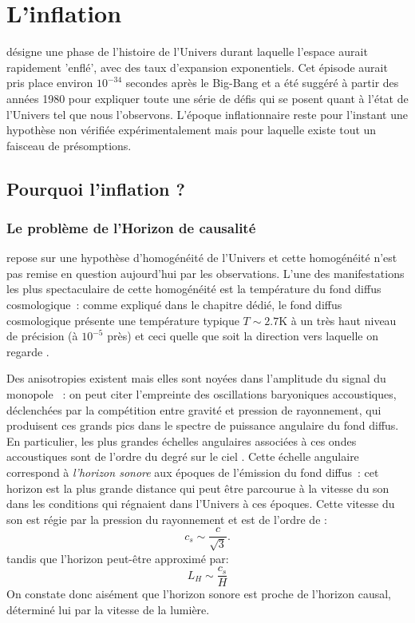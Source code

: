 \chapter{L'inflation}
 désigne une phase de l'histoire de l'Univers durant laquelle l'espace aurait rapidement 'enflé', avec des taux d'expansion exponentiels. Cet épisode aurait pris place environ $10^{-34}$ secondes après le Big-Bang et a été suggéré à partir des années 1980 pour expliquer toute une série de défis qui se posent quant à l'état de l'Univers tel que nous l'observons. L'époque inflationnaire reste pour l'instant une hypothèse non vérifiée expérimentalement mais pour laquelle existe tout un faisceau de présomptions.

\section{Pourquoi l'inflation ?}
\subsection{Le problème de l'Horizon de causalité}
 repose sur une hypothèse d'homogénéité de l'Univers et cette homogénéité n'est pas remise en question aujourd'hui par les observations. L'une des manifestations les plus spectaculaire de cette homogénéité est la température du fond diffus cosmologique~: comme expliqué dans le chapitre dédié, le fond diffus cosmologique présente une température typique $T\sim 2.7 $K à un très haut niveau de précision (à $10^{-5}$ près) et ceci quelle que soit la direction vers laquelle on regarde . 

Des anisotropies existent mais elles sont noyées dans l'amplitude du signal du monopole~ : on peut citer l'empreinte des oscillations baryoniques accoustiques, déclenchées par la compétition entre gravité et pression de rayonnement, qui produisent ces grands pics dans le spectre de puissance angulaire du fond diffus. En particulier, les plus grandes échelles angulaires associées à ces ondes accoustiques sont de l'ordre du degré sur le ciel . Cette échelle angulaire correspond à \textit{l'horizon sonore} aux époques de l'émission du fond diffus~: cet horizon est la plus grande distance qui peut être parcourue à la vitesse du son dans les conditions qui régnaient dans l'Univers à ces époques. Cette vitesse du son est régie par la pression du rayonnement et est de l'ordre de :
\begin{equation}
c_s\sim \frac{c}{\sqrt 3}.
\end{equation}
tandis que l'horizon peut-être approximé par:
\begin{equation}
L_H\sim\frac{c_s}{H}
\end{equation}
On constate donc aisément que l'horizon sonore est proche de l'horizon causal, déterminé lui par la vitesse de la lumière.

